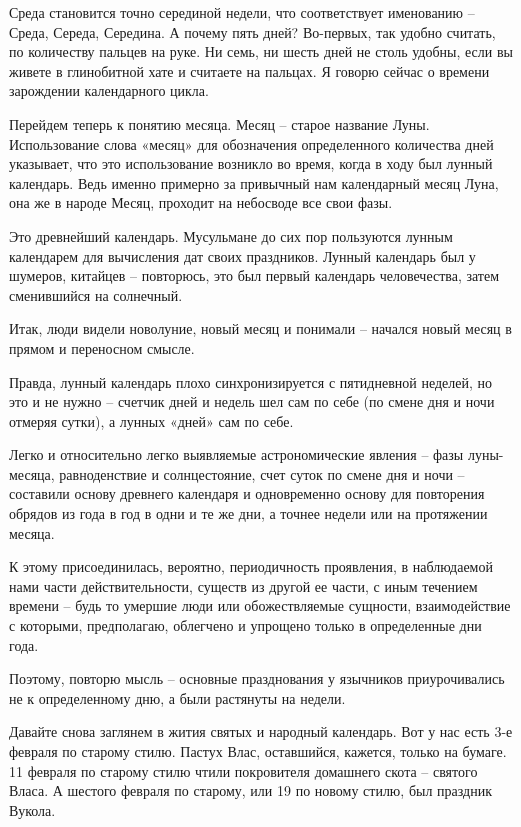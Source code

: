 Среда становится точно серединой недели, что соответствует именованию – Среда, Середа, Середина. А почему пять дней? Во-первых, так удобно считать, по количеству пальцев на руке. Ни семь, ни шесть дней не столь удобны, если вы живете в глинобитной хате и считаете на пальцах. Я говорю сейчас о времени зарождении календарного цикла.

   Перейдем теперь к понятию месяца. Месяц – старое название Луны. Использование слова «месяц» для обозначения определенного количества дней указывает, что это использование возникло во время, когда в ходу был лунный календарь. Ведь именно примерно за привычный нам календарный месяц Луна, она же в народе Месяц, проходит на небосводе все свои фазы.

   Это древнейший календарь. Мусульмане до сих пор пользуются лунным календарем для вычисления дат своих праздников. Лунный календарь был у шумеров, китайцев – повторюсь, это был первый календарь человечества, затем сменившийся на солнечный.

   Итак, люди видели новолуние, новый месяц и понимали – начался новый месяц в прямом и переносном смысле. 

Правда, лунный календарь плохо синхронизируется с пятидневной неделей, но это и не нужно – счетчик дней и недель шел сам по себе (по смене дня и ночи отмеряя сутки), а лунных «дней» сам по себе.

   Легко и относительно легко выявляемые астрономические явления – фазы луны-месяца, равноденствие и солнцестояние, счет суток по смене дня и ночи – составили основу древнего календаря и одновременно основу для повторения обрядов из года в год в одни и те же дни, а точнее недели или на протяжении месяца.

   К этому присоединилась, вероятно, периодичность проявления, в наблюдаемой нами части действительности, существ из другой ее части, с иным течением времени – будь то умершие люди или обожествляемые сущности, взаимодействие с которыми, предполагаю, облегчено и упрощено только в определенные дни года.

   Поэтому, повторю мысль – основные празднования у язычников приурочивались не к определенному дню, а были растянуты на недели.

   Давайте снова заглянем в жития святых и народный календарь. Вот у нас есть 3-е февраля по старому стилю. Пастух Влас, оставшийся, кажется, только на бумаге. 11 февраля по старому стилю чтили покровителя домашнего скота – святого Власа. А шестого февраля по старому, или 19 по новому стилю, был праздник Вукола.

